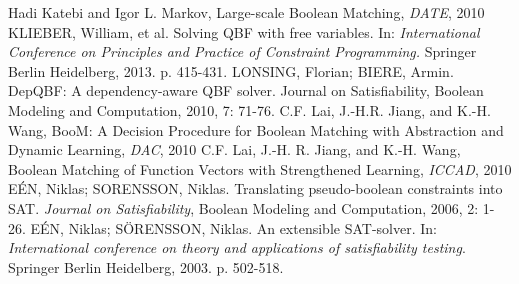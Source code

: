 




%
%
%
\begin{thebibliography}{1}

\bibitem{}
    Hadi Katebi and Igor L. Markov, Large-scale Boolean Matching, \emph{DATE}, 2010
\bibitem{}
    KLIEBER, William, et al. Solving QBF with free variables. In: \emph{International Conference on Principles and Practice of Constraint Programming.} Springer Berlin Heidelberg, 2013. p. 415-431.
\bibitem{}
    LONSING, Florian; BIERE, Armin. DepQBF: A dependency-aware QBF solver. Journal on Satisfiability, Boolean Modeling and Computation, 2010, 7: 71-76.
\bibitem{}
    C.F. Lai, J.-H.R. Jiang, and K.-H. Wang, BooM: A Decision Procedure for Boolean Matching with Abstraction and Dynamic Learning, \emph{DAC}, 2010
\bibitem{}    
    C.F. Lai, J.-H. R. Jiang, and K.-H. Wang, Boolean Matching of Function Vectors with Strengthened Learning, \emph{ICCAD}, 2010
\bibitem{}
    EÉN, Niklas; SORENSSON, Niklas. Translating pseudo-boolean constraints into SAT. \emph{Journal on Satisfiability}, Boolean Modeling and Computation, 2006, 2: 1-26.
\bibitem{}
    EÉN, Niklas; SÖRENSSON, Niklas. An extensible SAT-solver. In: \emph{International conference on theory and applications of satisfiability testing}. Springer Berlin Heidelberg, 2003. p. 502-518.

\end{thebibliography}







